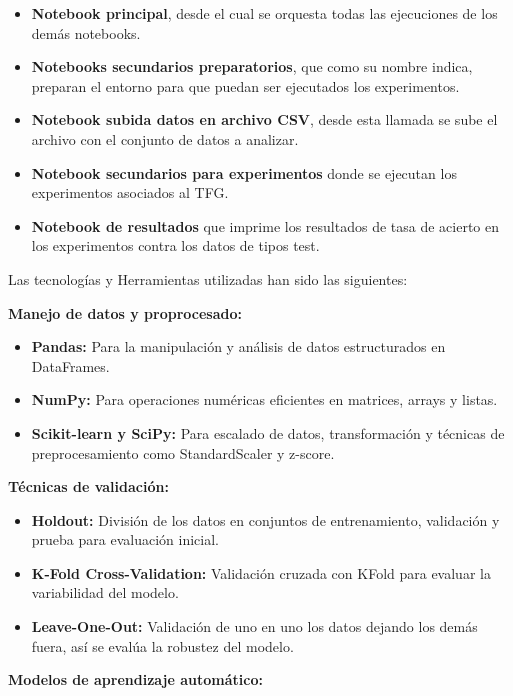   \begin{itemize}
  \tightlist
  \item
   \textbf{Notebook principal}, desde el cual se orquesta todas las ejecuciones de los demás notebooks.
  \item
   \textbf{Notebooks secundarios preparatorios}, que como su nombre indica, preparan el entorno para que puedan ser ejecutados los experimentos.
  \item
   \textbf{Notebook subida datos en archivo CSV}, desde esta llamada se sube el archivo con el conjunto de datos a analizar.
  \item
   \textbf{Notebook secundarios para experimentos} donde se ejecutan los experimentos asociados al TFG.
  \item
   \textbf{Notebook de resultados} que imprime los resultados de tasa de acierto en los experimentos contra los datos de tipos test.
  \end{itemize}
  

Las tecnologías y Herramientas utilizadas han sido las siguientes:

  \textbf{Manejo de datos y proprocesado:}

  \begin{itemize}
  \tightlist
  \item
   \textbf{Pandas:} Para la manipulación y análisis de datos estructurados en DataFrames.
  \item
   \textbf{NumPy:} Para operaciones numéricas eficientes en matrices, arrays y listas.
  \item
   \textbf{Scikit-learn y SciPy:} Para escalado de datos, transformación y técnicas de preprocesamiento como StandardScaler y z-score.
  \end{itemize}

  \textbf{Técnicas de validación:}

  \begin{itemize}
  \tightlist
  \item
   \textbf{Holdout:} División de los datos en conjuntos de entrenamiento, validación y prueba para evaluación inicial.
  \item
   \textbf{K-Fold Cross-Validation:} Validación cruzada con KFold para evaluar la variabilidad del modelo.
  \item
   \textbf{Leave-One-Out:} Validación de uno en uno los datos dejando los demás fuera, así se evalúa la robustez del modelo. 
  \end{itemize} 
  
  \textbf{Modelos de aprendizaje automático:}

